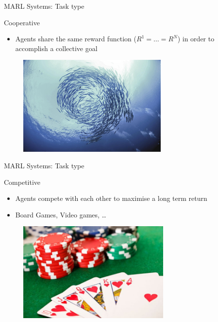 \documentclass[presentation]{beamer}\mode<presentation>{\usetheme{AMSBolognaFC}}
\begin{document}
\begin{frame}{MARL Systems: Task type}
	\begin{alertblock}{Cooperative}
		\begin{itemize}
			\item Agents share the same reward function ($R^1 = \dots = R^N$) in order to accomplish a collective goal
		\end{itemize}
	\end{alertblock}
	\begin{figure}
		\includegraphics[height=5cm]{img/cooperative}
	\end{figure}
\end{frame}

\begin{frame}{MARL Systems: Task type}
	\begin{exampleblock}{Competitive}
		\begin{itemize}
			\item Agents compete with each other to maximise a long term return
			\item Board Games, Video games, \dots
		\end{itemize}
	\end{exampleblock}

	\begin{figure}
		\includegraphics[height=5cm]{img/competitive}
	\end{figure}
\end{frame}
\end{document}
